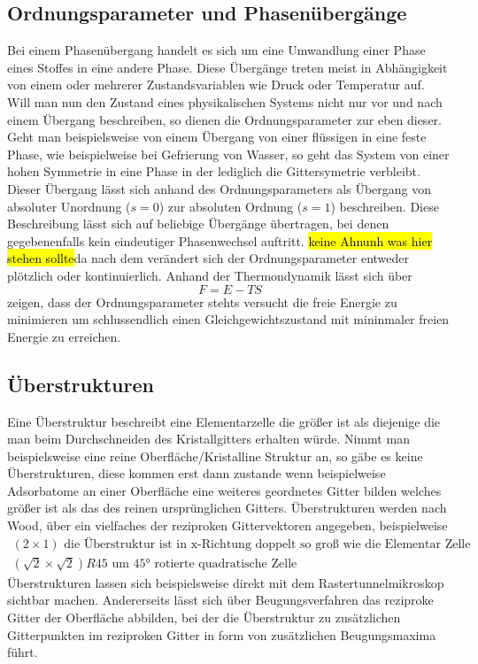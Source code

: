     \subsection{Ordnungsparameter und Phasenübergänge}
       Bei einem Phasenübergang handelt es sich um eine Umwandlung einer Phase eines Stoffes in 
       eine andere Phase. Diese Übergänge treten meist in Abhängigkeit von einem oder mehrerer Zustandsvariablen
       wie Druck oder Temperatur auf.\\
       Will man nun den Zustand eines physikalischen Systems nicht nur vor und nach einem Übergang beschreiben,
       so dienen die Ordnungsparameter zur eben dieser. Geht man beispielsweise von einem Übergang von einer
       flüssigen in eine feste Phase, wie beispielweise bei Gefrierung von Wasser, so geht das System von einer
       hohen Symmetrie in eine Phase in der lediglich die Gittersymetrie verbleibt. Dieser Übergang lässt sich
       anhand des Ordnungsparameters als Übergang von absoluter Unordnung ($s=0$) zur absoluten Ordnung
       ($s=1$) beschreiben. Diese Beschreibung lässt sich auf beliebige Übergänge übertragen, bei denen
       gegebenenfalls kein eindeutiger Phasenwechsel auftritt.\hl{ keine Ahnunh was hier stehen sollte}da nach dem verändert sich der Ordnungsparameter
       entweder plötzlich oder kontinuierlich. Anhand der Thermondynamik lässt sich über
       \begin{equation}
           F = E-TS
       \end{equation}
       zeigen, dass der Ordnungsparameter stehts versucht die freie Energie zu minimieren um schlussendlich
       einen Gleichgewichtszustand mit mininmaler freien Energie zu erreichen. 

    \subsection{Überstrukturen}
        Eine Überstruktur beschreibt eine Elementarzelle die größer ist als diejenige die man beim Durchschneiden
        des Kristallgitters erhalten würde. Nimmt man beispielsweise eine reine Oberfläche/Kristalline Struktur an, so
        gäbe es keine Überstrukturen, diese kommen erst dann zustande wenn beispielweise Adsorbatome an einer Oberfläche
        eine weiteres geordnetes Gitter bilden welches größer ist als das des reinen ursprünglichen Gitters.
        Überstrukturen werden nach Wood, über ein vielfaches der reziproken Gittervektoren angegeben, beispielweise
        \begin{align*}
            (2\times1) \text{  die Überstruktur ist in x-Richtung doppelt so groß wie die Elementar Zelle}\\
            (\sqrt{2}\times\sqrt{2})R45 \text{  um 45° rotierte quadratische Zelle}
        \end{align*}
        Überstrukturen lassen sich beispielsweise direkt mit dem Rastertunnelmikroskop sichtbar machen.
        Andererseits lässt sich über Beugungsverfahren das reziproke Gitter der Oberfläche abbilden, bei der die
        Überstruktur zu zusätzlichen Gitterpunkten im reziproken Gitter in form von zusätzlichen Beugungsmaxima
        führt. 

